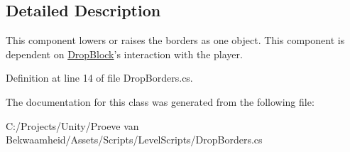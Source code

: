 \subsection{Detailed Description}
This component lowers or raises the borders as one object. This component is dependent on \hyperlink{class_drop_block}{Drop\+Block}'s interaction with the player. 



Definition at line 14 of file Drop\+Borders.\+cs.



The documentation for this class was generated from the following file\+:\begin{DoxyCompactItemize}
\item 
C\+:/\+Projects/\+Unity/\+Proeve van Bekwaamheid/\+Assets/\+Scripts/\+Level\+Scripts/Drop\+Borders.\+cs\end{DoxyCompactItemize}
